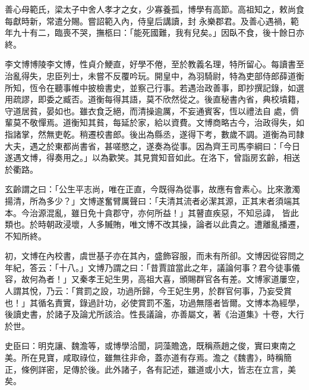 \begin{pinyinscope}
 善心母範氏，梁太子中舍人孝才之女，少寡養孤，博學有高節。高祖知之，敕尚食每獻時新，常遣分賜。嘗詔範入內，侍皇后講讀，封
 永樂郡君。及善心遇禍，範年九十有二，臨喪不哭，撫柩曰：「能死國難，我有兒矣。」因臥不食，後十餘日亦終。



 李文博博陵李文博，性貞介鯁直，好學不倦，至於教義名理，特所留心。每讀書至治亂得失，忠臣列士，未嘗不反覆吟玩。開皇中，為羽騎尉，特為吏部侍郎薛道衡所知，恆令在聽事帷中披檢書史，並察己行事。若遇治政善事，即抄撰記錄，如選用疏謬，即委之臧否。道衡每得其語，莫不欣然從之。後直秘書內省，典校墳籍，守道居貧，晏如也。雖衣食乏絕，而清操逾厲，不妄通賓客，恆以禮法自
 處，儕輩莫不敬憚焉。道衡知其貧，每延於家，給以資費。文博商略古今，治政得失，如指諸掌，然無吏乾。稍遷校書郎。後出為縣丞，遂得下考，數歲不調。道衡為司隸大夫，遇之於東都尚書省，甚嗟愍之，遂奏為從事。因為齊王司馬李綱曰：「今日遂遇文博，得奏用之。」以為歡笑。其見賞知音如此。在洛下，曾詣房玄齡，相送於衢路。



 玄齡謂之曰：「公生平志尚，唯在正直，今既得為從事，故應有會素心。比來激濁揚清，所為多少？」文博遂奮臂厲聲曰：「夫清其流者必潔其源，正其末者須端其本。今治源混亂，雖日免十貪郡守，亦何所益！」其瞽直疾惡，不知忌諱，
 皆此類也。於時朝政浸壞，人多贓賄，唯文博不改其操，論者以此貴之。遭離亂播遷，不知所終。



 初，文博在內校書，虞世基子亦在其內，盛飾容服，而未有所卻。文博因從容問之年紀，答云：「十八。」文博乃謂之曰：「昔賈誼當此之年，議論何事？君今徒事儀容，故何為者！」又秦孝王妃生男，高祖大喜，頒賜群官各有差。文博家道屢空，人謂其悅，乃云：「賞罰之設，功過所歸，今王妃生男，於群官何事，乃妄受賞也！」其循名責實，錄過計功，必使賞罰不濫，功過無隱者皆爾。文博本為經學，後讀史書，於諸子及論尤所該洽。性長議論，亦善屬文，著《治道集》十卷，大行
 於世。



 史臣曰：明克讓、魏澹等，或博學洽聞，詞藻贍逸，既稱燕趙之俊，實曰東南之美。所在見寶，咸取祿位，雖無往非命，蓋亦道有存焉。澹之《魏書》，時稱簡正，條例詳密，足傳於後。此外諸子，各有記述，雖道或小大，皆志在立言，美矣。



\end{pinyinscope}